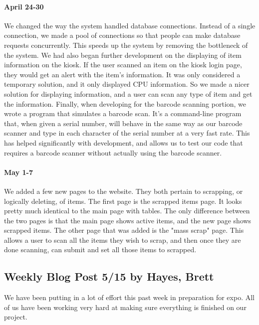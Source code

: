 \documentclass[10pt, onecolumn, twoside, peerreview]{IEEEtran}
\begin{document}
\paragraph*{April 24-30}

​We changed the way the system handled database connections. Instead of a single connection, we made a pool of connections so that people can make database requests concurrently. This speeds up the system by removing the bottleneck of the system. We had also began further development on the displaying of item information on the kiosk. If the user scanned an item on the kiosk login page, they would get an alert with the item's information. It was only considered a temporary solution, and it only displayed CPU information. So we made a nicer solution for displaying information, and a user can scan any type of item and get the information.​​​ Finally, when developing for the barcode scanning portion, we wrote a program that simulates a barcode scan. It's a command-line program that, when given a serial number, will behave in the same way as our barcode scanner and type in each character of the serial number at a very fast rate. This has helped significantly with development, and allows us to test our code that requires a barcode scanner without actually using the barcode scanner.\\

\paragraph*{May 1-​7}

​We added a few new pages to the website. They both pertain to scrapping, or logically deleting, of items. The first page is the scrapped items page. It looks pretty much identical to the main page with tables. The only difference between the two pages is that the main page shows active items, and the new page shows scrapped items. The other page that was added is the "mass scrap" page. This allows a user to scan all the items they wish to scrap, and then once they are done scanning, can submit and set all those items to scrapped.

\subsection{Weekly Blog Post 5/15 by Hayes, Brett}
We have been putting in a lot of effort this past week in preparation for expo. All of us have been working very hard at making sure everything is finished on our project.\\
\end{document}
